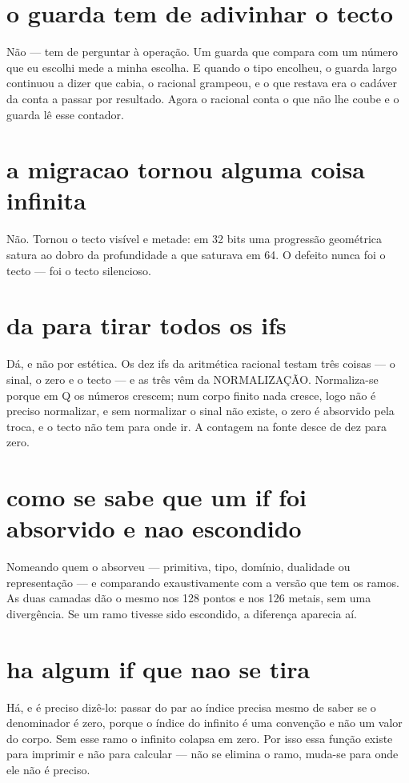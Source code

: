 \documentclass[11pt,a4paper]{article}
\begin{document}
\section{o guarda tem de adivinhar o tecto}
Não — tem de perguntar à operação. Um guarda que compara com um número que eu escolhi mede
a minha escolha. E quando o tipo encolheu, o guarda largo continuou a dizer que cabia, o
racional grampeou, e o que restava era o cadáver da conta a passar por resultado. Agora o
racional conta o que não lhe coube e o guarda lê esse contador.

\section{a migracao tornou alguma coisa infinita}
Não. Tornou o tecto visível e metade: em 32 bits uma progressão geométrica satura ao dobro
da profundidade a que saturava em 64. O defeito nunca foi o tecto — foi o tecto silencioso.

\section{da para tirar todos os ifs}
Dá, e não por estética. Os dez ifs da aritmética racional testam três coisas — o sinal, o
zero e o tecto — e as três vêm da NORMALIZAÇÃO. Normaliza-se porque em Q os números
crescem; num corpo finito nada cresce, logo não é preciso normalizar, e sem normalizar o
sinal não existe, o zero é absorvido pela troca, e o tecto não tem para onde ir. A
contagem na fonte desce de dez para zero.

\section{como se sabe que um if foi absorvido e nao escondido}
Nomeando quem o absorveu — primitiva, tipo, domínio, dualidade ou representação — e
comparando exaustivamente com a versão que tem os ramos. As duas camadas dão o mesmo nos
128 pontos e nos 126 metais, sem uma divergência. Se um ramo tivesse sido escondido, a
diferença aparecia aí.

\section{ha algum if que nao se tira}
Há, e é preciso dizê-lo: passar do par ao índice precisa mesmo de saber se o denominador
é zero, porque o índice do infinito é uma convenção e não um valor do corpo. Sem esse
ramo o infinito colapsa em zero. Por isso essa função existe para imprimir e não para
calcular — não se elimina o ramo, muda-se para onde ele não é preciso.
\end{document}
